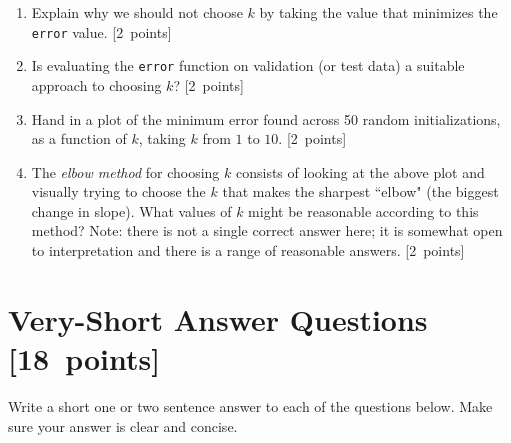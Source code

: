 \documentclass{article}
\newcommand{\blu}[1]{{\textcolor{blu}{#1}}}
\let\ask\blu
\newcommand\pts[1]{\textcolor{pointscolour}{[#1~points]}}
\begin{document}
    \begin{enumerate}
        \item \ask{Explain why we should not choose $k$ by taking the value that minimizes the \texttt{error} value.} \pts{2}
        \item \ask{Is evaluating the \texttt{error} function on validation (or test data) a suitable approach to choosing $k$?} \pts{2}
        
        \item \ask{Hand in a plot of the minimum error found across 50 random initializations, as a function of $k$, taking $k$ from $1$ to $10$.} \pts{2}
        \item The \emph{elbow method} for choosing $k$ consists of looking at the above plot and visually trying to choose the $k$ that makes the sharpest ``elbow" (the biggest change in slope). \ask{What values of $k$ might be reasonable according to this method?} Note: there is not a single correct answer here; it is somewhat open to interpretation and there is a range of reasonable answers. \pts{2}
    \end{enumerate}

    \clearpage
    \section{Very-Short Answer Questions \pts{18}}

    \ask{Write a short one or two sentence answer to each of the questions below}. Make sure your answer is clear and concise.
\end{document}
